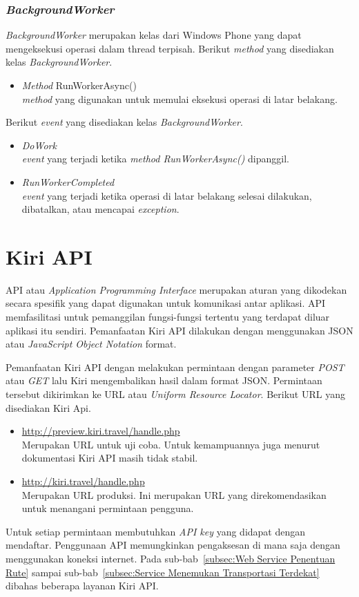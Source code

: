 \subsubsection{\textit{BackgroundWorker}}
\label{subsubsec:BackgroundWorker}
\hspace{0.5cm} \textit{BackgroundWorker} merupakan kelas dari Windows Phone yang dapat mengeksekusi operasi dalam thread terpisah. Berikut \textit{method} yang disediakan kelas \textit{BackgroundWorker}.
\begin{itemize}
	\item \textit{Method} RunWorkerAsync() \\
	\textit{method} yang digunakan untuk memulai eksekusi operasi di latar belakang.
\end{itemize}

Berikut \textit{event} yang disediakan kelas \textit{BackgroundWorker}.
\begin{itemize}
	\item \textit{DoWork} \\
	\textit{event} yang terjadi ketika \textit{method RunWorkerAsync()} dipanggil.
	\item \textit{RunWorkerCompleted} \\
	\textit{event} yang terjadi ketika operasi di latar belakang selesai dilakukan, dibatalkan, atau mencapai \textit{exception}.
\end{itemize}

\section{Kiri API}
\label{sec:Kiri API}
\hspace{0.5cm} API atau \textit{Application Programming Interface} merupakan aturan yang dikodekan secara spesifik yang dapat digunakan untuk komunikasi antar aplikasi. API memfasilitasi untuk pemanggilan fungsi-fungsi tertentu yang terdapat diluar aplikasi itu sendiri. Pemanfaatan Kiri API dilakukan dengan menggunakan JSON atau \textit{JavaScript Object Notation} format. 

Pemanfaatan Kiri API dengan melakukan permintaan dengan parameter \textit{POST} atau \textit{GET} lalu Kiri mengembalikan hasil dalam format JSON. Permintaan tersebut dikirimkan ke URL atau \textit{Uniform Resource Locator}. Berikut URL yang disediakan Kiri Api.
\begin{itemize}
	\item \url{http://preview.kiri.travel/handle.php} \\
	Merupakan URL untuk uji coba. Untuk kemampuannya juga menurut dokumentasi Kiri API masih tidak stabil.
	\item \url{http://kiri.travel/handle.php} \\
	Merupakan URL produksi. Ini merupakan URL yang direkomendasikan untuk menangani permintaan pengguna.
\end{itemize}
Untuk setiap permintaan membutuhkan \textit{API key} yang didapat dengan mendaftar\cite{Kiri}. Penggunaan API memungkinkan pengaksesan di mana saja dengan menggunakan koneksi internet. Pada sub-bab~\ref{subsec:Web Service Penentuan Rute} sampai sub-bab~\ref{subsec:Service Menemukan Transportasi Terdekat} dibahas beberapa layanan Kiri API.

